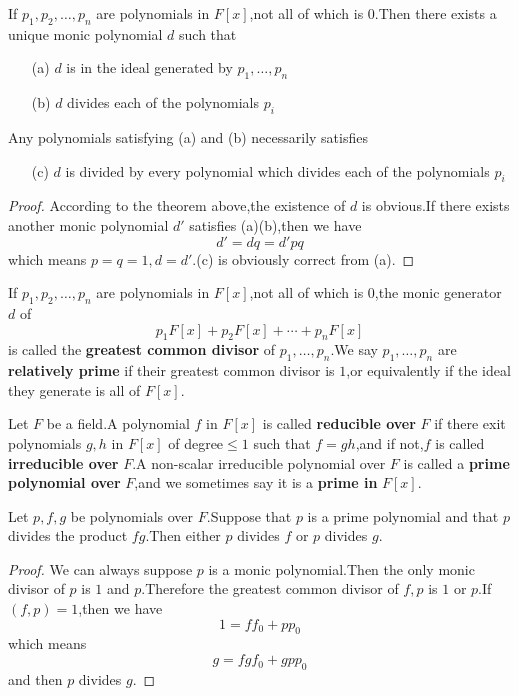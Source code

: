 \documentclass{article}
\begin{document}
\begin{coro}
	If $p_1,p_2,\dots,p_n$ are polynomials in $F[x]$,not all of which is $0$.Then there exists a unique monic polynomial $d$ such that
	\begin{enumerate}
		\item [(a)]$d$ is in the ideal generated by $p_1,\dots,p_n$
		\item [(b)]$d$ divides each of the polynomials $p_i$
	\end{enumerate}
	Any polynomials satisfying (a) and (b) necessarily satisfies
	\begin{enumerate}
		\item [(c)]$d$ is divided by every polynomial which divides each of the polynomials $p_i$
	\end{enumerate} 
\end{coro}
\begin{proof}
	According to the theorem above,the existence of $d$ is obvious.If there exists another monic polynomial $d'$ satisfies (a)(b),then we have
	\[d'=dq=d'pq\]
	which means $p=q=1,d=d'$.(c) is obviously correct from (a). 
\end{proof}
\begin{dde}
	If $p_1,p_2,\dots,p_n$ are polynomials in $F[x]$,not all of which is $0$,the monic generator $d$ of 
	\[p_1F[x]+p_2F[x]+\cdots+p_nF[x]\]
	is called the \textbf{greatest common divisor} of $p_1,\dots,p_n$.We say $p_1,\dots,p_n$ are \textbf{relatively prime} if their greatest common divisor is $1$,or equivalently if the ideal they generate is all of $F[x]$.
\end{dde}
\begin{dde}
	Let $F$ be a field.A polynomial $f$ in $F[x]$ is called \textbf{reducible over} $F$ if there exit polynomials $g,h$ in $F[x]$ of degree$\le1$ such that $f=gh$,and if not,$f$ is called \textbf{irreducible over} $F$.A non-scalar irreducible polynomial over $F$ is called a \textbf{prime polynomial over} $F$,and we sometimes say it is a \textbf{prime in} $F[x]$.  
\end{dde}
\begin{thm}
	Let $p,f,g$ be polynomials over $F$.Suppose that $p$ is a prime polynomial and that $p$ divides the product $fg$.Then either $p$ divides $f$ or $p$ divides $g$.
\end{thm}
\begin{proof}
	We can always suppose $p$ is a monic polynomial.Then the only monic divisor of $p$ is $1$ and $p$.Therefore the greatest common divisor of $f,p$ is $1$ or $p$.If $(f,p)=1$,then we have
	\[1=ff_0+pp_0\]
	which means
	\[g=fgf_0+gpp_0\]
	and then $p$ divides $g$.
\end{proof}
\end{document}
